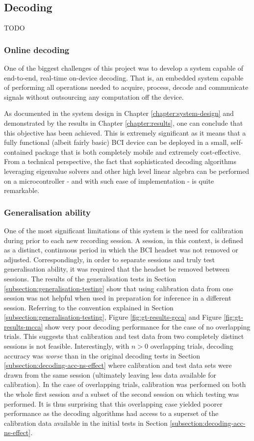\subsection{Decoding}
TODO

\subsubsection{Online decoding}
One of the biggest challenges of this project was to develop a system capable of end-to-end, real-time on-device decoding. That is, an embedded system capable of performing all operations needed to acquire, process, decode and communicate signals without outsourcing any computation off the device. 

As documented in the system design in Chapter \ref{chapter:system-design} and demonstrated by the results in Chapter \ref{chapter:results}, one can conclude that this objective has been achieved. This is extremely significant as it means that a fully functional (albeit fairly basic) BCI device can be deployed in a small, self-contained package that is both completely mobile and extremely cost-effective. From a technical perspective, the fact that sophisticated decoding algorithms leveraging eigenvalue solvers and other high level linear algebra can be performed on a microcontroller - and with such ease of implementation - is quite remarkable.  

\subsubsection{Generalisation ability}
One of the most significant limitations of this system is the need for calibration during prior to each new recording session. A session, in this context, is defined as a distinct, continuous period in which the BCI headset was not removed or adjusted. Correspondingly, in order to separate sessions and truly test generalisation ability, it was required that the headset be removed between sessions. The results of the generalisation tests in Section \ref{subsection:generalisation-testing} show that using calibration data from one session was not helpful when used in preparation for inference in a different session. Referring to the convention explained in Section \ref{subsection:generalisation-testing}, Figure \ref{fig:gt-results-gcca} and Figure \ref{fig:gt-results-mcca} show very poor decoding performance for the case of no overlapping trials. This suggests that calibration and test data from two completely distinct sessions is not feasible. Interestingly, with $n>0$ overlapping trials, decoding accuracy was \textit{worse} than in the original decoding tests in Section \ref{subsection:decoding-acc-ns-effect} where calibration and test data sets were drawn from the same session (ultimately leaving less data available for calibration). In the case of overlapping trials, calibration was performed on both the whole first session \textit{and} a subset of the second session on which testing was performed. It is thus surprising that this overlapping case yielded poorer performance as the decoding algorithms had access to a superset of the calibration data available in the initial tests in Section \ref{subsection:decoding-acc-ns-effect}. 

